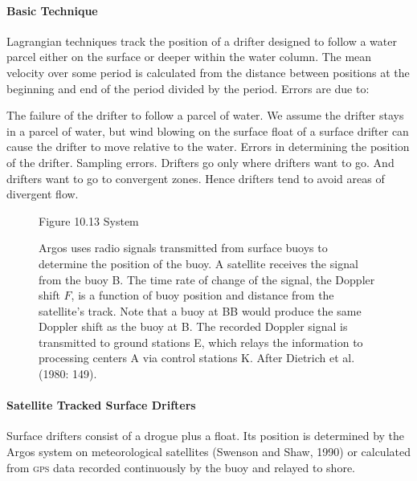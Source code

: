 \paragraph{Basic Technique}
Lagrangian techniques track the position of a drifter designed to follow a water
parcel either on the surface or deeper within the water column. The mean
velocity over some period is calculated from the distance between positions at
the beginning and end of the period divided by the period. Errors are due to:
\begin{enumerate}
\vitem The failure of the drifter to follow a parcel of water. We assume the
drifter stays in a parcel of water, but wind blowing on the surface float of a surface drifter can cause the drifter to move relative to the water.
\vitem Errors in determining the position of the drifter.
\vitem Sampling errors. Drifters go only where drifters want to go. And drifters want to go to convergent zones. Hence drifters
tend to avoid areas of divergent flow.
\end{enumerate}

\begin{figure}[t!]
\footnotesize
Figure 10.13 System\rule{0mm}{4ex} Argos uses radio signals transmitted from surface buoys to determine the position of the buoy. A satellite receives the signal from the buoy B. The time rate of change of the signal, the Doppler shift $F$, is a function of buoy position and distance from the satellite's track. Note that a buoy at BB would produce the same Doppler shift as the buoy at B. The recorded Doppler signal is transmitted to ground stations E, which relays the information to processing centers A via control stations K. After Dietrich et al. (1980: 149).
\label{fig:argos}
\vspace{-4ex}
\end{figure}

\paragraph{Satellite Tracked Surface Drifters}
Surface drifters consist of a drogue plus a float. Its position is determined by the Argos system on meteorological satellites (Swenson and Shaw, 1990) or calculated from \textsc{gps} data recorded continuously by the buoy and relayed to shore. 

